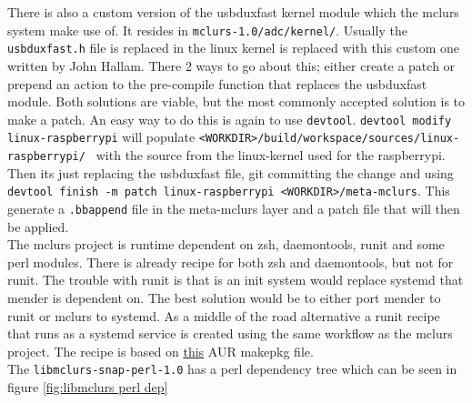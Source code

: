 \documentclass[../../main.tex]{subfiles}
\begin{document}
There is also a custom version of the usbduxfast kernel module which the mclurs system
make use of. It resides in \texttt{mclurs-1.0/adc/kernel/}. Usually the
\texttt{usbduxfast.h} file is replaced in the linux kernel is replaced with this custom
one written by John Hallam.
There 2 ways to go about this; either create a patch or prepend an action to the pre-compile
function that replaces the usbduxfast module.
Both solutions are viable, but the most commonly accepted solution is to make a patch.
An easy way to do this is again to use \texttt{devtool}.
\texttt{devtool modify linux-raspberrypi} will populate
\texttt{<WORKDIR>/build/workspace/sources/linux-raspberrypi/ }
with the source from the linux-kernel used for the raspberrypi.
Then its just replacing the usbduxfast file, git committing the change and
using \texttt{devtool finish -m patch linux-raspberrypi <WORKDIR>/meta-mclurs}.
This generate a \texttt{.bbappend} file in the meta-mclurs layer and a patch file
that will then be applied.\\

The mclurs project is runtime dependent on zsh, daemontools, runit and some perl modules.
There is already recipe for both zsh and daemontools, but not for runit.
The trouble with runit is that is an init system would replace systemd that mender is dependent on.
The best solution would be to either port mender to runit or mclurs to systemd.
As a middle of the road alternative a runit recipe that runs as a systemd service is created using
the same workflow as the mclurs project. The recipe is based on 
\href{https://aur.archlinux.org/cgit/aur.git/tree/PKGBUILD?h=runit-systemd}{this}
AUR makepkg file.\\

The \texttt{libmclurs-snap-perl-1.0} has a perl dependency tree which can be seen in
figure \ref{fig:libmclurs perl dep}
\end{document}
